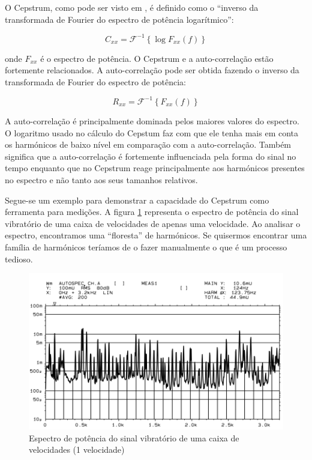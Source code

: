 O Cepstrum, como pode ser visto em \textcite{Notes}, é definido como o ``inverso da transformada de Fourier do espectro de potência logarítmico'': 

\begin{equation}
	C_{xx} = \mathcal{F}^{-1} \left \{ \log F_{xx}\left ( f \right ) \right \}
\end{equation}

	
	onde $F_{xx}$ é o espectro de potência. O Cepstrum e a auto-correlação estão fortemente relacionados. A auto-correlação pode ser obtida fazendo o inverso da transformada de Fourier do espectro de potência: 
	
\begin{equation}
	R_{xx} = \mathcal{F}^{-1} \left \{ F_{xx}\left ( f \right ) \right \}
\end{equation}


A auto-correlação é principalmente dominada pelos maiores valores do espectro. O logaritmo usado no cálculo do Cepstum faz com que ele tenha mais em conta os harmónicos de baixo nível em comparação com a auto-correlação. Também significa que a auto-correlação é fortemente influenciada pela forma do sinal no tempo enquanto que no Cepstrum reage principalmente aos harmónicos presentes no espectro e não tanto aos seus tamanhos relativos.

Segue-se um exemplo para demonstrar a capacidade do Cepstrum como ferramenta para medições. A figura \ref{spectrum Cepstrum1} representa o espectro de potência do sinal vibratório de uma caixa de velocidades de apenas uma velocidade. Ao analisar o espectro, encontramos uma ``floresta'' de harmónicos. Se quisermos encontrar uma família de harmónicos teríamos de o fazer manualmente o que é um processo tedioso.
	

\begin{figure}[H]
\centering
\includegraphics[scale=0.35]{figs/spectrum_cepstrum1}
\caption{Espectro de potência do sinal vibratório de uma caixa de velocidades (1 velocidade)}\label{spectrum Cepstrum1}
\end{figure}


